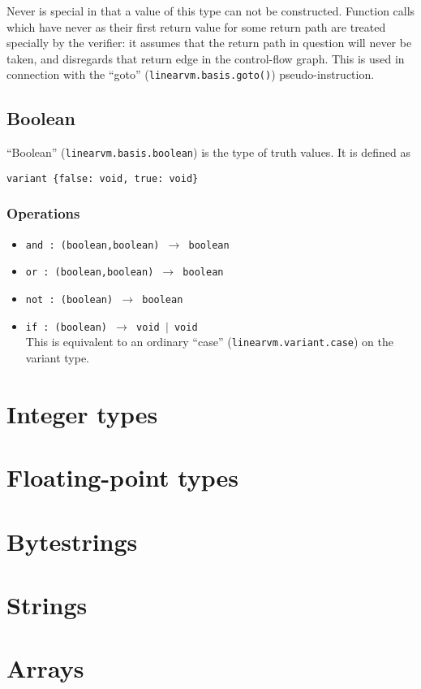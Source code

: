 \documentclass[a4paper]{book}
\begin{document}
Never is special in that a value of this type can not be constructed.
Function calls which have never as their first return value for some return
path are treated specially by the verifier: it assumes that the return
path in question will never be taken, and disregards that return edge
in the control-flow graph.
This is used in connection with the ``goto'' (\texttt{linearvm.basis.goto()})
pseudo-instruction.

\section{Boolean}
``Boolean'' (\texttt{linearvm.basis.boolean}) is the type of truth values.
It is defined as
\begin{center}
  \verb|variant {false: void, true: void}|
\end{center}
\subsection*{Operations}

\begin{itemize}
\item \texttt{and : (boolean,boolean) $\to$ boolean }
\item \texttt{or : (boolean,boolean) $\to$ boolean }
\item \texttt{not : (boolean) $\to$ boolean }
\item \texttt{if : (boolean) $\to$ void $|$ void }
  \\ This is equivalent to an ordinary ``case''
  (\texttt{linearvm.variant.case}) on the variant type.
\end{itemize}


\chapter{Integer types}
\chapter{Floating-point types}
\chapter{Bytestrings}
\chapter{Strings}
\chapter{Arrays}
\end{document}
